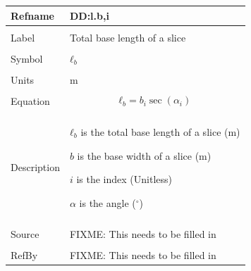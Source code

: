 \documentclass[12pt]{article}
\begin{document}
\noindent \begin{minipage}{\textwidth}
\begin{tabular}{p{} p{}}
\toprule \textbf{Refname} & \textbf{DD:l.b,i}
\label{DD:l.b,i}
\\ \midrule \\
Label & Total base length of a slice
\\ \midrule \\
Symbol & ${ℓ_{b}}$
\\ \midrule \\
Units & m
\\ \midrule \\
Equation & \begin{dmath}
           {ℓ_{b}}=b_{i} \sec\left(α_{i}\right)
           \end{dmath}
\\ \midrule \\
Description & \begin{symbDescription}
              \item{${ℓ_{b}}$ is the total base length of a slice (m)}
              \item{$b$ is the base width of a slice (m)}
              \item{$i$ is the index (Unitless)}
              \item{$α$ is the angle (${}^{\circ}$)}
              \end{symbDescription}
\\ \midrule \\
Source & FIXME: This needs to be filled in
\\ \midrule \\
RefBy & FIXME: This needs to be filled in
\\ \bottomrule \end{tabular}
\end{minipage}\\
~\newline
\end{document}
